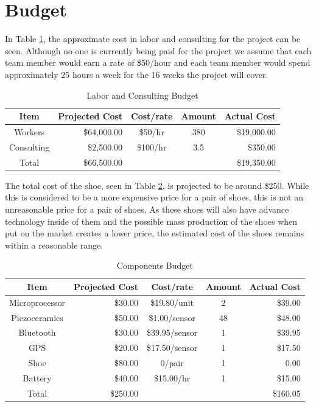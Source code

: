 \documentclass[letterpaper, 12 pt, onecolumn, hidelinks]{ieeetran}
\begin{document}
\section{Budget}\label{sec:Budget}
In Table \ref{table:Labor}, the approximate cost in labor and consulting for the project can be seen. Although no one is currently being paid for the project we assume that each team member would earn a rate of \$50/hour and each team member would spend approximately 25 hours a week for the 16 weeks the project will cover.

\begin{table}[h!]
	\caption{\label{table:Labor}Labor and Consulting Budget}
	\begin{center}
		\begin{tabular}{ c|r c c r } 
			Item & Projected Cost & Cost/rate & Amount & Actual Cost \\
			\hline
			Workers & \$64,000.00 & \$50/hr & 380 & \$19,000.00 \\ 
			Consulting & \$2,500.00 & \$100/hr & 3.5 & \$350.00 \\ 
			\hline
			Total & \$66,500.00 &  &  & \$19,350.00 \\
		\end{tabular}
	\end{center}
\end{table}

The total cost of the shoe, seen in Table \ref{table:Components}, is projected to be around \$250. While this is considered to be a more expensive price for a pair of shoes, this is not an unreasonable price for a pair of shoes. As these shoes will also have advance technology inside of them and the possible mass production of the shoes when put on the market creates a lower price, the estimated cost of the shoes remains within a reasonable range.

\begin{table}[h!]
	\caption{\label{table:Components}Components Budget}
	\begin{center}
		\begin{tabular}{ c|r c c r } 
			Item & Projected Cost & Cost/rate & Amount & Actual Cost \\
			\hline
			Microprocessor & \$30.00 & \$19.80/unit & 2 & \$39.00 \\ 
			Piezoceramics & \$50.00 & \$1.00/sensor & 48 & \$48.00 \\ 
			Bluetooth & \$30.00 & \$39.95/sensor & 1 & \$39.95 \\ 
			GPS & \$20.00 & \$17.50/sensor & 1 & \$17.50 \\ 
			Shoe & \$80.00 & 0/pair & 1 & 0.00 \\ 
			Battery & \$40.00 & \$15.00/hr & 1 & \$15.00 \\ 
			\hline
			Total & \$250.00 &  &  & \$160.05 \\
		\end{tabular}
	\end{center} 
\end{table}
\end{document}
